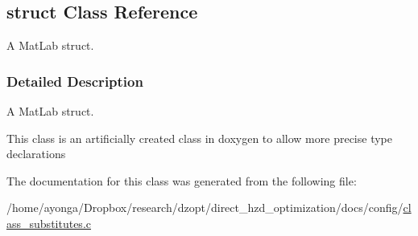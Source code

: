 \hypertarget{classstruct}{}\subsection{struct Class Reference}
\label{classstruct}


A Mat\+Lab struct.  




\subsubsection{Detailed Description}
A Mat\+Lab struct. 

This class is an artificially created class in doxygen to allow more precise type declarations 

The documentation for this class was generated from the following file\+:\begin{DoxyCompactItemize}
\item 
/home/ayonga/\+Dropbox/research/dzopt/direct\+\_\+hzd\+\_\+optimization/docs/config/\hyperlink{class__substitutes_8c}{class\+\_\+substitutes.\+c}\end{DoxyCompactItemize}
